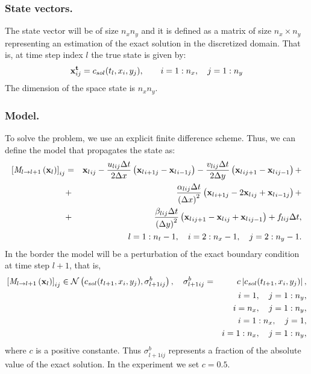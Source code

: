 \documentclass[12pt]{article}
\begin{document}
\subsubsection{State vectors.}
The state vector will be of size $n_x n_y$ and it is defined as a matrix of size $n_x \times n_y$ representing an estimation of the exact solution in the discretized domain. That is, at time step index $l$ the true state is given by:
\begin{equation}
{\bf x}_{ij}^{\bf t} = c_{sol}( t_l , x_i , y_j ), \qquad i = 1 : n_x, \quad j = 1 : n_y
\end{equation}
The dimension of the space state is $n_x n_y$.

\subsubsection{Model.} 
To solve the problem, we use an explicit finite difference scheme. Thus, we can define the model that propagates the state as:
\begin{eqnarray}
\left[ {\it M}_{l \rightarrow l+1} \left( {\bf x}_l \right) \right]_{i j} & = & {{\bf x}_l}_{ij} - \frac{u_{lij} \Delta t}{2 \Delta x} \left( {{\bf x}_l}_{i+1 j} - {{\bf x}_l}_{i-1 j} \right) - \frac{v_{lij} \Delta t}{2 \Delta y} \left( {{\bf x}_l}_{i j+1} - {{\bf x}_l}_{i j-1} \right) + \nonumber
\\
& + & \frac{\alpha_{lij} \Delta t}{\left( \Delta x \right)^2} \left( {{\bf x}_l}_{i+1 j} - 2 {{\bf x}_l}_{ij} + {{\bf x}_l}_{i-1 j} \right) + \nonumber 
\\
& + & \frac{\beta_{lij} \Delta t}{\left( \Delta y \right)^2} \left( {{\bf x}_l}_{i j+1} - {{\bf x}_l}_{ij} + {{\bf x}_l}_{i j-1} \right) + f_{lij} \Delta t, \nonumber 
\\
& & l = 1 : n_t - 1, \quad i = 2 : n_x - 1, \quad j = 2 : n_y - 1.
\end{eqnarray}
In the border the model will be a perturbation of the exact boundary condition at time step $l+1$, that is,
\begin{eqnarray}
\left[ {\it M}_{l \rightarrow l+1} \left( {\bf x}_l \right) \right]_{i j} \in \mathcal{N} \left( c_{sol}( t_{l+1} , x_i , y_j ) , {\sigma}_{l+1 i j}^b \right), \quad {\sigma}_{l+1 i j}^b & = & c \left| c_{sol}( t_{l+1} , x_i , y_j )  \right|, 
\\
& & i = 1 , \quad j = 1 : n_y , 
\\
& & i = n_x , \quad j = 1 : n_y , 
\\
& & i = 1 : n_x , \quad j = 1, 
\\
& & i = 1 : n_x, \quad j = 1 : n_y,
\end{eqnarray}
where $c$ is a positive constante. Thus ${\sigma}_{l+1 i j}^b$ represents a fraction of the absolute value of the exact solution. In the experiment we set $c = 0.5$. 
\end{document}
